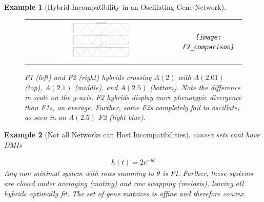 \documentclass[9 pt]{article}
\newcommand{\1}{\mathbbm{1}}
\newtheorem{example}{Example}
\begin{document}
\begin{example}[Hybrid Incompatibility in an Oscillating Gene Network]
        \begin{figure}[H]
          \centering
          \begin{tabular}{cc}
            \includegraphics[width=0.5\textwidth, height=0.25\paperheight]{F1_comparison} & 
            \texttt{[image: F2\_comparison]}
          \end{tabular}
          \caption{F1 (left) and F2 (right) hybrids crossing $A(2)$ with $A(2.01)$ (top), $A(2.1)$ (middle), and $A(2.5)$ (bottom).
          Note the difference in scale on the $y$-axis. F2 hybrids display more phenotypic divergence than F1s, on average. Further, some F2s completely fail to oscillate, as seen in an $A(2.5)$ F2 (light blue).}
        \end{figure}
    \end{example}
      \begin{example}[Not all Networks can Host Incompatibilities]
        convex sets cant have DMIs

        \begin{align*}
          h(t) = 2 e^{- \theta t}
        \end{align*}
        Any non-minimal system with rows summing to $\theta$ is PI. Further, these systems are closed under averaging (mating) and row swapping (meiosis), leaving all hybrids optimally fit. The set of gene matrices is affine and therefore convex.  
      \end{example}
\end{document}
